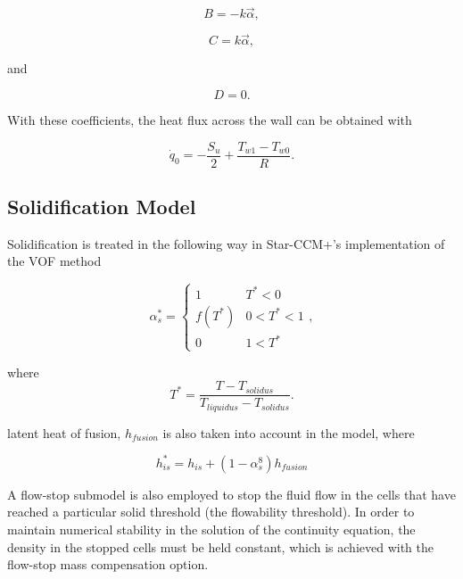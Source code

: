 \documentclass{UCF_ETD}
\begin{document}
\begin{equation}
    B = -k\vec{\alpha},
    \label{eq:HTC_B}
\end{equation}

\begin{equation}
    C = k\vec{\alpha},
    \label{eq:HTC_C}
\end{equation}

and

\begin{equation}
    D = 0. 
    \label{eq:HTC_D}
\end{equation}

With these coefficients, the heat flux across the wall can be obtained with

\begin{equation}
    \dot{q}_0=-\frac{S_u}{2}+\frac{T_{w 1}-T_{w 0}}{R}.
    \label{eq:wallHF}
\end{equation}

\subsection{Solidification Model}
\label{sec:solidmodel}
Solidification is treated in the following way in Star-CCM+'s implementation of the VOF method \cite{starccm}

\begin{equation}
    \alpha^{*}_{s} = \begin{cases}
    1 & T^{*} < 0 \\
    f(T^{*})& 0<T^{*}<1 \\
    0& 1 < T^{*}
    \end{cases},
    \label{eq:solidificationModel}
\end{equation}

\noindent where
\begin{equation}
    T^{*} = \frac{T - T_{solidus}}{T_{liquidus} - T_{solidus}}.
\end{equation}

\noindent latent heat of fusion, $h_{fusion}$ is also taken into account in the model, where

\begin{equation}
    h_{is}^{*} = h_{is} + \left( 1 - \alpha_{s}^{8}\right)h_{fusion}
\end{equation}

\noindent A flow-stop submodel is also employed to stop the fluid flow in the cells that have reached a particular solid threshold (the flowability threshold). In order to maintain numerical stability in the solution of the continuity equation, the density in the stopped cells must be held constant, which is achieved with the flow-stop mass compensation option.  
\end{document}
